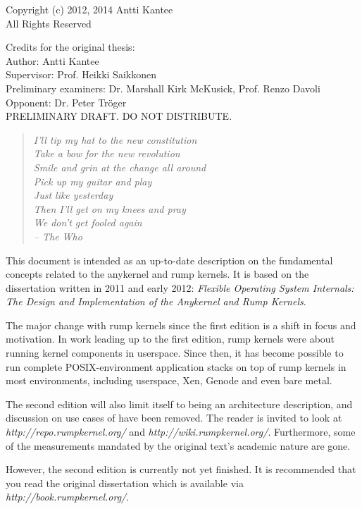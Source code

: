 \documentclass[openright]{tkkdiss}
\begin{document}


\cleardoublepage

Copyright (c) 2012, 2014 Antti Kantee\\
All Rights Reserved

Credits for the original thesis: \\
Author: Antti Kantee \\
Supervisor: Prof. Heikki Saikkonen \\
Preliminary examiners: Dr. Marshall Kirk McKusick, Prof. Renzo Davoli \\
Opponent: Dr. Peter Tr\"{o}ger \\

{\large PRELIMINARY DRAFT.  DO NOT DISTRIBUTE.}

\begin{preface}

\begin{verse}
\textit{I'll tip my hat to the new constitution\\
Take a bow for the new revolution\\
Smile and grin at the change all around\\
Pick up my guitar and play\\
Just like yesterday\\
Then I'll get on my knees and pray\\
We don't get fooled again\\
-- The Who}
\end{verse}

This document is intended as an up-to-date description on the fundamental
concepts related to the anykernel and rump kernels.  It is based on the
dissertation written in 2011 and early 2012: \textit{Flexible
Operating System Internals: The Design and Implementation of the Anykernel
and Rump Kernels}.

The major change with rump kernels since the first edition is a shift
in focus and motivation.  In work leading up to the first edition, rump
kernels were about running kernel components in userspace.  Since then,
it has become possible to run complete POSIX-environment application
stacks on top of rump kernels in most environments, including userspace,
Xen, Genode and even bare metal.

The second edition will also limit itself to being an architecture
description, and discussion on use cases of have been removed.  The reader
is invited to look at \textit{http://repo.rumpkernel.org/} and
\textit{http://wiki.rumpkernel.org/}.  Furthermore, some of the
measurements mandated by the original text's academic nature are gone.

However, the second edition is currently not yet finished.  It is
recommended that you read the original dissertation which is available
via \textit{http://book.rumpkernel.org/}.

\end{preface}


\tableofcontents


\begin{listofabbreviations}

\printnomenclature[5cm]

\end{listofabbreviations}


\listoffigures
\listoftables







\end{document}
